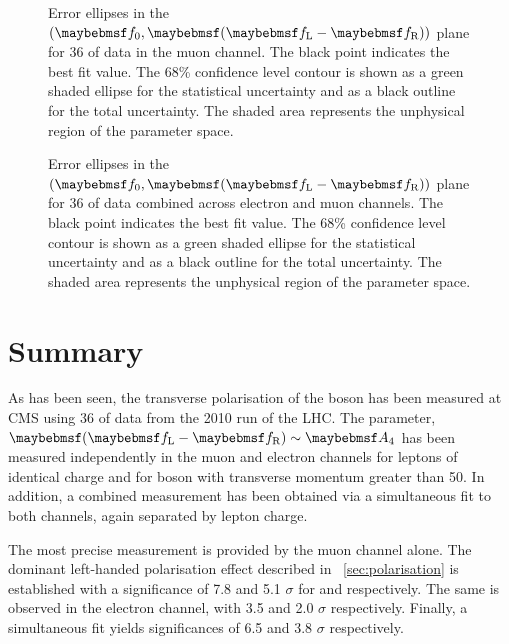 \begin{figure}[h!]
\centering
{}\quad
{}
\caption{Error ellipses in the $(\f0, \fLmfR)$ plane for \unit{36}{\invpb} of
  data in the muon channel. The black point indicates the best fit value. The
  68\% confidence level contour is shown as a green shaded ellipse for the
  statistical uncertainty and as a black outline for the total uncertainty. The
  shaded area represents the unphysical region of the parameter space.}
\label{fig:wpol_contour_mu}
\end{figure}


\begin{figure}[h!]
\centering
{}\quad
{}
\caption{Error ellipses in the $(\f0, \fLmfR)$ plane for \unit{36}{\invpb} of
  data combined across electron and muon channels. The black point indicates the
  best fit value. The 68\% confidence level contour is shown as a green shaded
  ellipse for the statistical uncertainty and as a black outline for the total
  uncertainty. The shaded area represents the unphysical region of the parameter
  space.}
\label{fig:wpol_contour_comb}
\end{figure}







\section{Summary}
As has been seen, the transverse polarisation of the \PW boson has been measured
at \ac{CMS} using \unit{36}{\invpb} of data from the 2010 run of the
\ac{LHC}. The parameter, $\fLmfR \sim \Afour$ has been measured independently in
the muon and electron channels for leptons of identical charge and for \PW boson
with transverse momentum greater than \unit{50}{\GeV}. In addition, a combined
measurement has been obtained via a simultaneous fit to both channels, again
separated by lepton charge.

The most precise measurement is provided by the muon channel alone. The dominant
left-handed polarisation effect described in \sec~\ref{sec:polarisation} is
established with a significance of 7.8 and 5.1 $\sigma$ for \PWp and \PWm
respectively. The same is observed in the electron channel, with 3.5 and 2.0
$\sigma$ respectively. Finally, a simultaneous fit yields significances of 6.5
and 3.8 $\sigma$ respectively.

